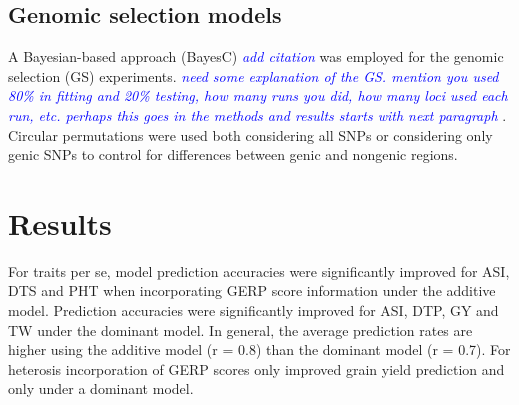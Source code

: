 \documentclass[a0,portrait]{a0poster}
\newcommand{\jri}[1]{\textcolor{blue}{ \emph{\scriptsize  #1}} }
\begin{document}
\begin{multicols}{2}
\subsection*{Genomic selection models}

A Bayesian-based approach (BayesC) \citep{} \jri{add citation} was employed for the genomic selection (GS) experiments. \jri{need some explanation of the GS. mention you used 80\% in fitting and 20\% testing, how many runs you did, how many loci used each run, etc.  perhaps this goes in the methods and results starts with next paragraph}.  Circular permutations were used both considering all SNPs or considering only genic SNPs to control for differences between genic and nongenic regions.



\section*{Results}

For traits per se, model prediction accuracies were significantly improved for ASI, DTS and PHT when incorporating GERP score information under the additive model. Prediction accuracies were significantly improved for ASI, DTP, GY and TW under the dominant model. In general, the average prediction rates are higher using the additive model (r = 0.8) than the dominant model (r = 0.7). For heterosis incorporation of GERP scores only improved grain yield prediction and only under a dominant model.  


\end{multicols}
\end{document}
